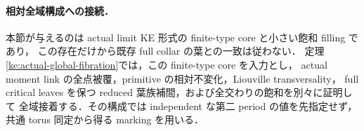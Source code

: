 \paragraph{相対全域構成への接続．}
本節が与えるのは actual limit KE 形式の finite-type core と小さい飽和 filling であり，
この存在だけから既存 full collar の葉との一致は従わない．
定理\ref{ke:actual-global-fibration}では，この finite-type core を入力とし，
actual moment link の全点被覆，primitive の相対不変化，Liouville transversality，
full critical leaves を保つ reduced 葉族補間，および全交わりの飽和を別々に証明して
全域接着する．その構成では independent な第二 period の値を先指定せず，
共通 torus 同定から得る marking を用いる．
